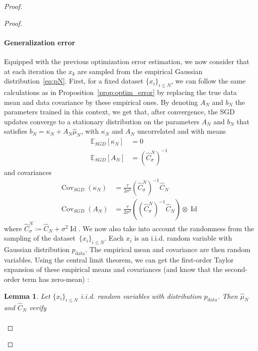 \documentclass[11pt]{article}
\newtheorem{lem}{Lemma}
\newcommand{\eqdef}{\coloneqq}
\newcommand{\id}{\operatorname{Id}}
\newcommand{\EE}{\mathbb{E}}
\newcommand{\cov}{\operatorname{Cov}}
\begin{document}
\begin{proof}
\begin{proof}
\paragraph{Generalization error} 
Equipped with the previous optimization error estimation, we now consider that at each iteration the $x_k$ are sampled from the empirical Gaussian distribution~\eqref{eq:pN}. First, for a fixed dataset $\{x_i\}_{i \leq N}$, we can follow the same calculations as in Proposition~\ref{prop:optim_error} by replacing the true data mean and data covariance by these empirical ones. By denoting $A_N$ and $b_N$ the parameters trained in this context, we get that, after convergence, the SGD updates converge to a stationary distribution on the parameters $A_N$ and $b_N$ that satisfies 
$b_N = \kappa_N + A_N \hat \mu_N$, with $\kappa_N$ and $A_N$ uncorrelated and with means
\begin{align} \label{eq:exp_bN}
 \EE_{SGD}[\kappa_N] &= 0
 \\ \EE_{SGD}[A_N] &= (\hat C_\sigma^N)^{-1} 
\end{align}
and covariances
\begin{align}
\cov_{SGD}(\kappa_N) &=  \frac{\tau}{2\sigma^2} (\hat C^N_\sigma)^{-1} \hat C_N \\
\cov_{SGD}(A_N) &=  \frac{\tau}{2\sigma^2}  \left( (\hat C^N_\sigma)^{-1} \hat C_N \right) \otimes \id  \label{eq:exp_AN_h}
\end{align}
where $\hat C^N_\sigma \eqdef \hat C_N + \sigma^2 \id$.
We now also take into account the randomness from the sampling of the dataset~$\{x_i\}_{i \leq N}$. Each $x_i$ is an i.i.d. random variable with Gaussian distribution $p_\mathrm{data}$. The empirical mean and covariance are then random variables. Using the central limit theorem, we can get the first-order Taylor expansion of these empirical means and covariances (and know that the second-order term has zero-mean) :
\begin{lem} \label{lem:SGD_4}
Let $\{x_i\}_{i \leq N}$  i.i.d. random variables with distribution $p_\mathrm{data}$. Then $\hat \mu_N$ and $\hat C_N$ verify
\begin{align} \label{eq:muN}

\end{align}
\end{lem}
\end{proof}
\end{proof}
\end{document}
